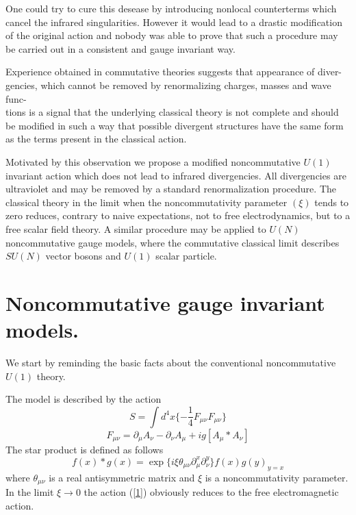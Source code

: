 \documentclass[a4paper,12pt]{article}
\begin{document}
One could try to cure this desease by introducing nonlocal counterterms
which cancel the infrared singularities. However it would
lead to a drastic modification of the original action and nobody was able
to prove that such a procedure may be carried out in a consistent and
gauge invariant way.

Experience obtained in commutative theories suggests that appearance of
diver-\\gencies, which cannot be removed by renormalizing charges, masses
and wave func-\\tions is a signal that the underlying classical theory is
not complete and should be modified in such a way that possible divergent
structures have the same form as the terms present in the classical
action.

Motivated by this observation we propose a modified noncommutative $U(1)$
invariant action which does not lead to infrared divergencies. All
divergencies are ultraviolet and may be removed by a standard
renormalization procedure. The classical theory in the limit
when the noncommutativity parameter $(\xi)$ tends to zero
 reduces, contrary to naive
expectations, not to free electrodynamics, but to a free scalar field
theory. A similar procedure may be applied to $U(N)$ noncommutative gauge
models, where the commutative classical limit describes $SU(N)$
vector bosons and $U(1)$ scalar particle.

\section{Noncommutative gauge invariant models.}

We start by reminding the basic facts about the conventional
noncommutative $U(1)$ theory.

The model is described by the action
\begin{equation}
S= \int d^4x \{- \frac{1}{4}F_{\mu \nu}F_{\mu \nu} \}
\label{1}
\end{equation}
\begin{equation}
F_{\mu \nu}= \partial_{\mu}A_{\nu}- \partial_{\nu}A_{\mu}+ig[A_{\mu}*
 A_{\nu}]
\label{2}
\end{equation}
The star product is defined as follows
\begin{equation}
f(x)* g(x)= \exp \{i \xi \theta_{\mu \nu} \partial_{\mu}^x
 \partial_{\nu}^y \}f(x)g(y)_{y=x}
\label{3}
\end{equation}
where $\theta_{\mu \nu}$ is a real antisymmetric matrix and $\xi$ is a
 noncommutativity parameter. In the limit $ \xi \rightarrow 0$ the action
 (\ref{1}) obviously reduces to the free electromagnetic action.
\end{document}
